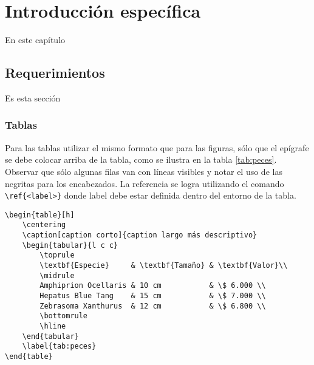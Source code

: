 \chapter{Introducción específica} %

\label{Chapter2}

En este capítulo


\section{Requerimientos}
\label{sec:requerimientos}

Es esta sección

\subsection{Tablas}

Para las tablas utilizar el mismo formato que para las figuras, sólo que el epígrafe se debe colocar arriba de la tabla, como se ilustra en la tabla \ref{tab:peces}. Observar que sólo algunas filas van con líneas visibles y notar el uso de las negritas para los encabezados.  La referencia se logra utilizando el comando \verb|\ref{<label>}| donde label debe estar definida dentro del entorno de la tabla.

\begin{verbatim}
\begin{table}[h]
	\centering
	\caption[caption corto]{caption largo más descriptivo}
	\begin{tabular}{l c c}    
		\toprule
		\textbf{Especie}     & \textbf{Tamaño} & \textbf{Valor}\\
		\midrule
		Amphiprion Ocellaris & 10 cm           & \$ 6.000 \\		
		Hepatus Blue Tang    & 15 cm           & \$ 7.000 \\
		Zebrasoma Xanthurus  & 12 cm           & \$ 6.800 \\
		\bottomrule
		\hline
	\end{tabular}
	\label{tab:peces}
\end{table}
\end{verbatim}


